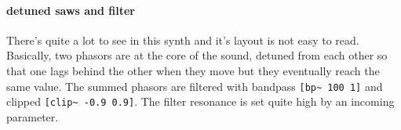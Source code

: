 \paragraph{detuned saws and filter}
There's quite a lot to see in this synth and it's layout is 
not easy to read. Basically, two phasors are at the
core of the sound, detuned from each other so that one lags
behind the other when they move but they eventually reach the
same value. The summed phasors are filtered with 
bandpass \verb+[bp~ 100 1]+ and clipped \verb+[clip~ -0.9 0.9]+. The 
filter resonance is set quite high by an incoming parameter.


